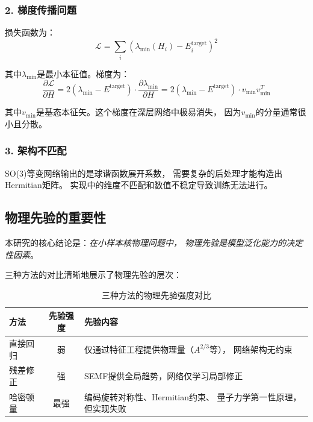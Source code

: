 \documentclass[12pt, a4paper]{article}
\begin{document}
\subsubsection{2. 梯度传播问题}

损失函数为：
\begin{equation}
  \mathcal{L} = \sum_i \left( \lambda_{\min}(H_i) - E_i^{\text{target}} \right)^2
\end{equation}

其中$\lambda_{\min}$是最小本征值。梯度为：
\begin{equation}
  \frac{\partial \mathcal{L}}{\partial H} = 2 \left( \lambda_{\min} - E^{\text{target}} \right)
  \cdot \frac{\partial \lambda_{\min}}{\partial H}
  = 2 \left( \lambda_{\min} - E^{\text{target}} \right) \cdot v_{\min} v_{\min}^T
\end{equation}

其中$v_{\min}$是基态本征矢。这个梯度在深层网络中极易消失，
因为$v_{\min}$的分量通常很小且分散。

\subsubsection{3. 架构不匹配}

SO(3)等变网络输出的是球谐函数展开系数，
需要复杂的后处理才能构造出Hermitian矩阵。
实现中的维度不匹配和数值不稳定导致训练无法进行。

\subsection{物理先验的重要性}

本研究的核心结论是：\emph{在小样本核物理问题中，
物理先验是模型泛化能力的决定性因素}。

三种方法的对比清晰地展示了物理先验的层次：

\begin{table}[htbp]
  \centering
  \caption{三种方法的物理先验强度对比}
  \label{tab:prior_strength}
  \begin{tabular}{lcp{8cm}}
    \toprule
    \textbf{方法} & \textbf{先验强度} & \textbf{先验内容} \\
    \midrule
    直接回归 & 弱 & 仅通过特征工程提供物理量（$A^{2/3}$等），
                    网络架构无约束 \\
    \midrule
    残差修正 & 强 & SEMF提供全局趋势，网络仅学习局部修正 \\
    \midrule
    哈密顿量 & 最强 & 编码旋转对称性、Hermitian约束、
                      量子力学第一性原理，但实现失败 \\
    \bottomrule
  \end{tabular}
\end{table}
\end{document}
